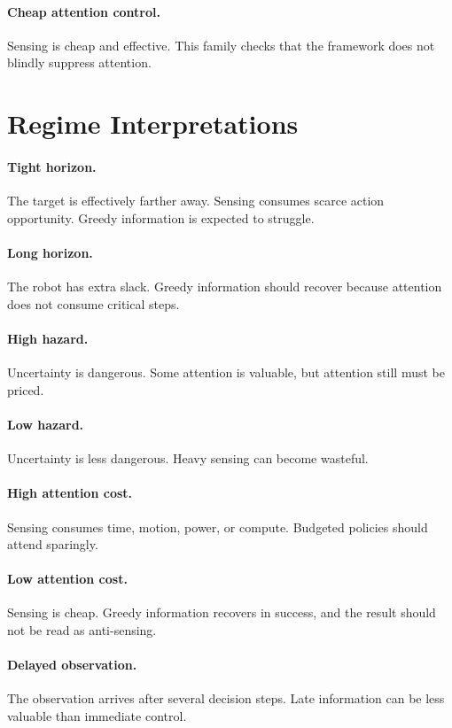 \documentclass{article}
\begin{document}
\paragraph{Cheap attention control.}
Sensing is cheap and effective. This family checks that the framework does not
blindly suppress attention.

\section{Regime Interpretations}

\paragraph{Tight horizon.}
The target is effectively farther away. Sensing consumes scarce action
opportunity. Greedy information is expected to struggle.

\paragraph{Long horizon.}
The robot has extra slack. Greedy information should recover because attention
does not consume critical steps.

\paragraph{High hazard.}
Uncertainty is dangerous. Some attention is valuable, but attention still must
be priced.

\paragraph{Low hazard.}
Uncertainty is less dangerous. Heavy sensing can become wasteful.

\paragraph{High attention cost.}
Sensing consumes time, motion, power, or compute. Budgeted policies should
attend sparingly.

\paragraph{Low attention cost.}
Sensing is cheap. Greedy information recovers in success, and the result
should not be read as anti-sensing.

\paragraph{Delayed observation.}
The observation arrives after several decision steps. Late information can be
less valuable than immediate control.
\end{document}

